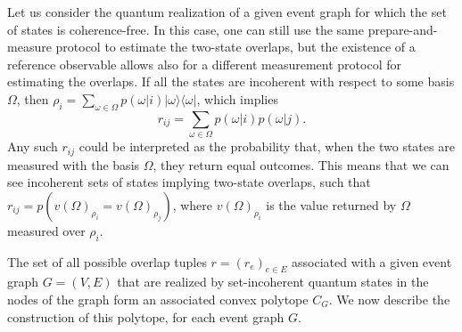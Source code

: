 \documentclass[a4paper,twocolumn,11pt,accepted=2024-01-17]{quantumarticle}
\begin{document}
{Let us consider the quantum realization of a given event graph for which the set of states is coherence-free. In this case, one can still use the same prepare-and-measure protocol to estimate the two-state overlaps, but the existence of a reference observable allows also for a different measurement protocol for estimating the overlaps. }If all the states are incoherent with respect to some basis $\Omega$, then $\rho_i = \sum_{\omega \in \Omega} p(\omega \vert i)\vert \omega \rangle \langle \omega \vert $, which implies \begin{equation}\label{eq: classical overlap}
    r_{ij} = \sum_{\omega \in \Omega} p(\omega \vert i)p(\omega \vert j).
\end{equation} Any such $r_{ij}$ could be interpreted as the probability that, when the two states are measured with the basis $\Omega$, they return equal outcomes. This means that we can see incoherent sets of states implying two-state overlaps, such that $r_{ij} = p(v(\Omega)_{\rho_i} = v(\Omega)_{\rho_j})$, where $v(\Omega)_{\rho_i}$ is the value returned by $\Omega$ measured over $\rho_i$. 

{ The set of all possible overlap tuples $r = (r_e)_{e \in E}$ associated with a given event graph $G=(V,E)$ that are realized by set-incoherent quantum states in the nodes of the graph form an associated convex polytope $C_G$. We now describe the construction of this polytope, for each event graph $G$.}
\end{document}
